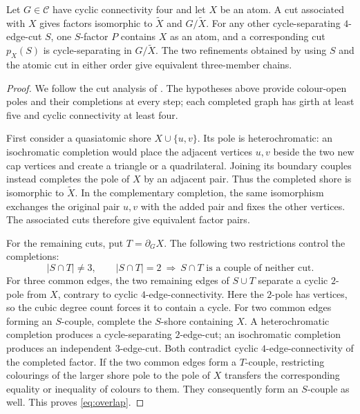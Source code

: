 \documentclass[justified,notoc,twoside,nobib,nofonts]{tufte-handout}
\begin{document}
\begin{lemma}\label{lem:atom-switching}
Let $G\in\mathcal C$ have cyclic connectivity four and let $X$ be an
atom. A cut associated with $X$ gives factors isomorphic to
$\widetilde X$ and $G/\widetilde X$.
For any other cycle-separating $4$-edge-cut $S$, one $S$-factor $P$
contains $X$ as an atom, and a corresponding cut $p_X(S)$ is
cycle-separating in $G/\widetilde X$.
The two refinements obtained by using $S$ and the atomic cut in
either order give equivalent three-member chains.
\end{lemma}
\begin{proof}
We follow the cut analysis of \citep[Proposition~8.2, Lemmas~9.1--9.2,
Propositions~9.3--9.4, and Lemma~10.1]{CS10}. The hypotheses above
provide colour-open poles and their completions at every step;
each completed graph has girth at least five and cyclic connectivity
at least four.

First consider a quasiatomic shore $X\cup\{u,v\}$.
Its pole is heterochromatic: an isochromatic completion would
place the adjacent vertices $u,v$ beside the two new cap vertices
and create a triangle or a quadrilateral. Joining its boundary
couples instead completes the pole of $X$ by an adjacent pair.
Thus the completed shore is isomorphic to $\widetilde X$.
In the complementary completion, the same isomorphism exchanges the
original pair $u,v$ with the added pair and fixes the other vertices.
The associated cuts therefore give equivalent factor pairs.

For the remaining cuts, put $T=\partial_G X$.
The following two restrictions control the completions:
\begin{equation}\label{eq:overlap}
 |S\cap T|\ne3,\qquad
 |S\cap T|=2\ \Longrightarrow\
 S\cap T\text{ is a couple of neither cut}.
\end{equation}
For three common edges, the two remaining edges of $S\cup T$
separate a cyclic $2$-pole from $X$, contrary to cyclic
$4$-edge-connectivity. Here the $2$-pole has vertices, so the cubic
degree count forces it to contain a cycle.
For two common edges forming an $S$-couple, complete the $S$-shore
containing $X$. A heterochromatic completion produces a
cycle-separating $2$-edge-cut; an isochromatic completion produces an
independent $3$-edge-cut. Both contradict cyclic
$4$-edge-connectivity of the completed factor.
If the two common edges form a $T$-couple, restricting colourings of
the larger shore pole to the pole of $X$ transfers the corresponding
equality or inequality of colours to them. They consequently
form an $S$-couple as well. This proves \eqref{eq:overlap}.


\end{proof}
\end{document}
